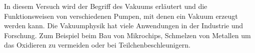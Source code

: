 In diesem Versuch wird der Begriff des Vakuums erläutert und die Funktionsweisen von verschiedenen Pumpen, mit denen ein Vakuum erzeugt werden kann. Die Vakuumphysik hat viele Anwendungen in der Industrie und Forschung. Zum Beispiel beim Bau von Mikrochips, Schmelzen von Metallen um das Oxidieren zu vermeiden oder bei Teilchenbeschleunigern.